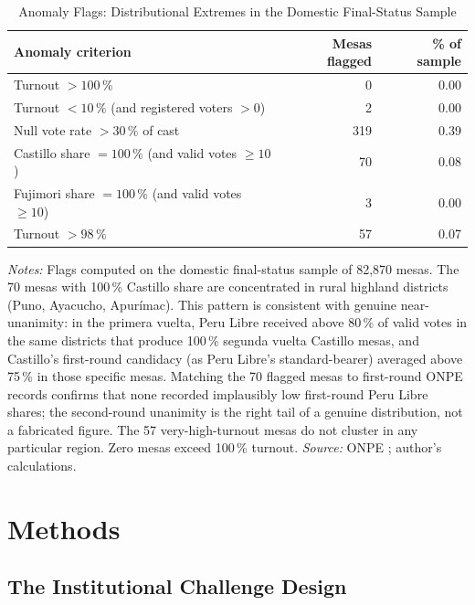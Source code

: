 \documentclass[12pt]{article}
\begin{document}
\begin{table}[H]
\centering
\caption{Anomaly Flags: Distributional Extremes in the Domestic Final-Status Sample}
\label{tab:flags}
\begin{tabular}{lrr}
\toprule
Anomaly criterion & Mesas flagged & \% of sample \\
\midrule
Turnout $> 100\,\%$ & 0 & 0.00 \\
Turnout $< 10\,\%$ (and registered voters $> 0$) & 2 & 0.00 \\
Null vote rate $> 30\,\%$ of cast & 319 & 0.39 \\
Castillo share $= 100\,\%$ (and valid votes $\geq 10$) & 70 & 0.08 \\
Fujimori share $= 100\,\%$ (and valid votes $\geq 10$) & 3 & 0.00 \\
Turnout $> 98\,\%$ & 57 & 0.07 \\
\bottomrule
\end{tabular}
\vspace{0.2cm}
\begin{minipage}{\textwidth}
\footnotesize
\textit{Notes:} Flags computed on the domestic final-status sample of 82,870 mesas.
The 70 mesas with 100\,\% Castillo share are concentrated in rural highland
districts (Puno, Ayacucho, Apur\'imac). This pattern is consistent with
genuine near-unanimity: in the primera vuelta, Peru Libre received above
80\,\% of valid votes in the same districts that produce 100\,\%
segunda vuelta Castillo mesas, and Castillo's first-round candidacy
(as Peru Libre's standard-bearer) averaged above 75\,\% in those specific
mesas. Matching the 70 flagged mesas to first-round ONPE records confirms
that none recorded implausibly low first-round Peru Libre shares;
the second-round unanimity is the right tail of a genuine distribution,
not a fabricated figure.
The 57 very-high-turnout mesas do not cluster in any particular region.
Zero mesas exceed 100\,\% turnout.
\textit{Source:} ONPE \citep{onpe2021}; author's calculations.
\end{minipage}
\end{table}

\section{Methods}
\label{sec:methods}

\subsection{The Institutional Challenge Design}
\label{subsec:challenge-design}
\end{document}
